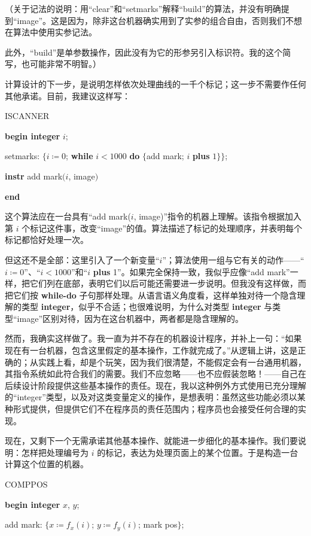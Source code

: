 \documentclass[twoside,11pt,fontset=none]{ctexbook}
\begin{document}
（关于记法的说明：用“clear”和“setmarks”解释“build”的算法，并没有明确提到“image”。这是因为，除非这台机器确实用到了实参的组合自由，否则我们不想在算法中使用实参记法。

此外，“build”是单参数操作，因此没有为它的形参另引入标识符。我的这个简写，也可能非常不明智。）

计算设计的下一步，是说明怎样依次处理曲线的一千个标记；这一步不需要作任何其他承诺。目前，我建议这样写：

ISCANNER

\textbf{begin integer} $i$;

\quad setmarks: $\{i \coloneq 0$; \textbf{while} $i < 1000$ \textbf{do} $\{$add mark; $i$ \textbf{plus} $1\}\}$;

\quad \textbf{instr} add mark$(i$, image$)$

\textbf{end}

\noindent
这个算法应在一台具有“add mark($i$, image)”指令的机器上理解。该指令根据加入第 $i$ 个标记这件事，改变“image”的值。算法描述了标记的处理顺序，并表明每个标记都恰好处理一次。

但这还不是全部：这里引入了一个新变量“$i$”；算法使用一组与它有关的动作——“$i \coloneq 0$”、\mbox{“$i < 1000$”}和“$i$ \textbf{plus} 1”。如果完全保持一致，我似乎应像“add mark”一样，把它们列在底部，表明它们以后可能还需要进一步说明。但我没有这样做，而把它们按 \textbf{while-do} 子句那样处理。从语言语义角度看，这样单独对待一个隐含理解的类型 \textbf{integer}，似乎不合适；也很难说明，为什么对类型 \textbf{integer} 与类型“image”区别对待，因为在这台机器中，两者都是隐含理解的。

然而，我确实这样做了。我一直为并不存在的机器设计程序，并补上一句：“如果现在有一台机器，包含这里假定的基本操作，工作就完成了。”从逻辑上讲，这是正确的；从实践上看，却是个玩笑，因为我们很清楚，不能假定会有一台通用机器，其指令系统如此符合我们的需要。我们不应忽略——也不应假装忽略！——自己在后续设计阶段提供这些基本操作的责任。现在，我以这种例外方式使用已充分理解的“integer”类型，以及对这类变量定义的操作，是想表明：虽然这些功能必须以某种形式提供，但提供它们不在程序员的责任范围内；程序员也会接受任何合理的实现。

现在，又剩下一个无需承诺其他基本操作、就能进一步细化的基本操作。我们要说明：怎样把处理编号为 $i$ 的标记，表达为处理页面上的某个位置。于是构造一台计算这个位置的机器。

COMPPOS
\nopagebreak

\textbf{begin integer} $x$, $y$;

\nopagebreak

\quad add mark: $\{x \coloneq f_x(i)$; $y \coloneq f_y(i)$; mark pos$\}$;
\end{document}
